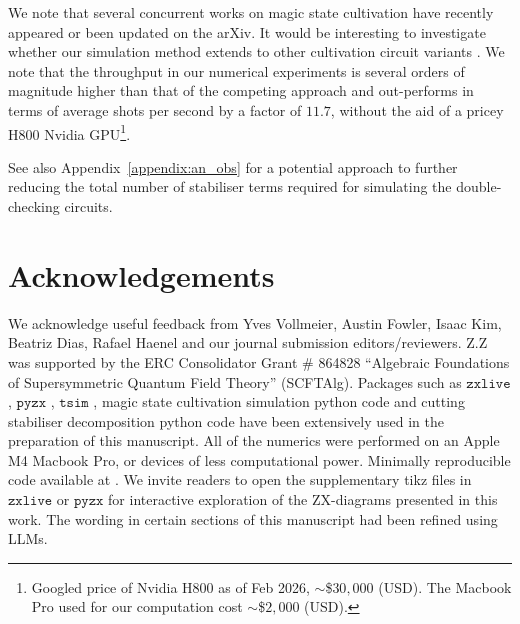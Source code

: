 \documentclass[a4paper,onecolumn,11pt,accepted=2026-06-10]{quantumarticle}
\begin{document}
We note that several concurrent works on magic state cultivation have recently appeared \cite{sahay2025foldtransversalsurfacecodecultivation,claes2025cultivatingtstatessurface,
surti2025efficientsimulationlogicalmagic} or been updated \cite{vaknin2025efficientmagicstatecultivation} on the arXiv. It would be interesting to investigate whether our simulation method extends to other cultivation circuit variants \cite{chen2025efficientmagicstatecultivation}. We note that the throughput in our numerical experiments is several orders of magnitude higher than that of the competing approach \cite{surti2025efficientsimulationlogicalmagic} and out-performs \cite{li2025softhighperformancesimulatoruniversal} in terms of average shots per second by a factor of $11.7$, without the aid of a pricey H800 Nvidia GPU\footnote{Googled price of Nvidia H800 as of Feb 2026, $\sim$\$$30{,}000$ (USD). The Macbook Pro used for our computation cost $\sim$\$$2{,}000$ (USD).}. 

See also Appendix~\ref{appendix:an_obs} for a potential approach to further reducing the total number of stabiliser terms required for simulating the double-checking circuits.

\section{Acknowledgements}
We acknowledge useful feedback from Yves Vollmeier, Austin Fowler, Isaac Kim, Beatriz Dias, Rafael Haenel and our journal submission editors/reviewers. Z.Z was supported by the ERC Consolidator Grant \# 864828 ``Algebraic Foundations of Supersymmetric Quantum Field Theory'' (SCFTAlg). Packages such as $\mathtt{zxlive}$, $\mathtt{pyzx}$ \cite{kissinger2020Pyzx}, $\mathtt{tsim}$ \cite{QuEraComputing_tsim_2026}, magic state cultivation simulation python code \cite{gidneyy2024cultivationdata} and cutting stabiliser decomposition python code \cite{Sutcliffe_2024} have been extensively used in the preparation of this manuscript. All of the numerics were performed on an Apple M4 Macbook Pro, or devices of less computational power. Minimally reproducible code available at \cite{Wan2026accel}. We invite readers to open the supplementary tikz files in $\mathtt{zxlive}$ or $\mathtt{pyzx}$ \cite{kissinger2020Pyzx} for interactive exploration of the ZX-diagrams presented in this work. The wording in certain sections of this manuscript had been refined using LLMs.




\clearpage
\end{document}
